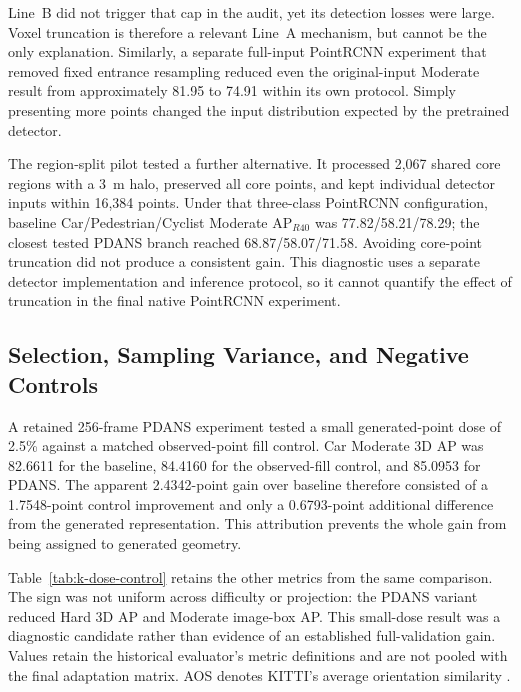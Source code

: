 
Line~B did not trigger that cap in the audit, yet its detection losses
were large. Voxel truncation is therefore a relevant Line~A mechanism,
but cannot be the only explanation. Similarly, a separate full-input
PointRCNN experiment that removed fixed entrance resampling reduced even
the original-input Moderate result from approximately 81.95 to 74.91
within its own protocol. Simply presenting more points changed the input
distribution expected by the pretrained detector.

The region-split pilot tested a further alternative. It processed 2,067
shared core regions with a 3~m halo, preserved all core points, and kept
individual detector inputs within 16,384 points. Under that three-class
PointRCNN configuration, baseline Car/Pedestrian/Cyclist Moderate
AP$_{R40}$ was 77.82/58.21/78.29; the closest tested PDANS branch
reached 68.87/58.07/71.58. Avoiding core-point truncation did not
produce a consistent gain. This diagnostic uses a separate detector
implementation and inference protocol, so it cannot quantify the effect
of truncation in the final native PointRCNN experiment.

\subsection{Selection, Sampling Variance, and Negative Controls}
A retained 256-frame PDANS experiment tested a small generated-point
dose of 2.5\% against a matched observed-point fill control.
Car Moderate 3D AP was 82.6611 for the baseline, 84.4160 for the
observed-fill control, and 85.0953 for PDANS. The apparent 2.4342-point
gain over baseline therefore consisted of a 1.7548-point control
improvement and only a 0.6793-point additional difference from the
generated representation. This attribution prevents the whole gain
from being assigned to generated geometry.

Table~\ref{tab:k-dose-control} retains the other metrics from the same
comparison. The sign was not uniform across difficulty or projection:
the PDANS variant reduced Hard 3D AP and Moderate image-box AP.
This small-dose result was a diagnostic candidate rather than evidence
of an established full-validation gain. Values retain the historical
evaluator's metric definitions and are not pooled with the final
adaptation matrix. AOS denotes KITTI's average orientation similarity
\cite{geiger2012kitti}.

